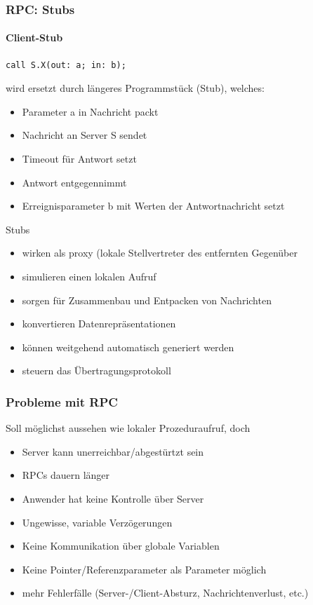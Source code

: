 \documentclass[10pt,a4paper]{article}
\begin{document}
\subsubsection{RPC: Stubs}
\paragraph{Client-Stub}
\begin{lstlisting}
call S.X(out: a; in: b);
\end{lstlisting}
wird ersetzt durch längeres Programmstück (Stub), welches:
\begin{itemize}
\setlength{\itemsep}{0cm}%
\setlength{\parskip}{0cm}%
\item Parameter a in Nachricht packt
\item Nachricht an Server S sendet
\item Timeout für Antwort setzt
\item Antwort entgegennimmt
\item Erreignisparameter b mit Werten der Antwortnachricht setzt 
\end{itemize}

Stubs
\begin{itemize}
\item wirken als proxy (lokale Stellvertreter des entfernten Gegenüber
\item simulieren einen lokalen Aufruf
\item sorgen für Zusammenbau und Entpacken von Nachrichten
\item konvertieren Datenrepräsentationen
\item können weitgehend automatisch generiert werden
\item steuern das Übertragungsprotokoll
\end{itemize}

\subsubsection{Probleme mit RPC}
Soll möglichst aussehen wie lokaler Prozeduraufruf, doch
\begin{itemize}
\item Server kann unerreichbar/abgestürtzt sein
\item RPCs dauern länger
\item Anwender hat keine Kontrolle über Server
\item Ungewisse, variable Verzögerungen
\item Keine Kommunikation über globale Variablen
\item Keine Pointer/Referenzparameter als Parameter möglich
\item mehr Fehlerfälle (Server-/Client-Absturz, Nachrichtenverlust, etc.)
\end{itemize}
\end{document}

